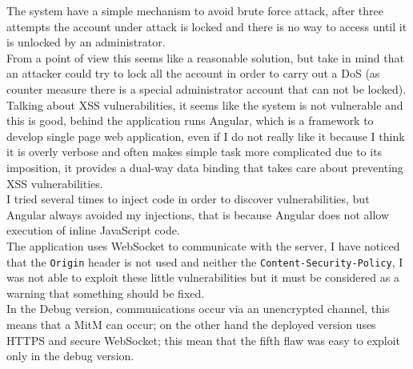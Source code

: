 The system have a simple mechanism to avoid brute force attack, after three attempts the account under attack is locked and there is no way to access
until it is unlocked by an administrator.\\
From a point of view this seems like a reasonable solution, but take in mind that an attacker could try to lock all the account in order to carry out
a DoS (as counter measure there is a special administrator account that can not be locked).\\
Talking about XSS vulnerabilities, it seems like the system is not vulnerable and this is good, behind the application runs Angular, which is a
framework to develop single page web application, even if I do not really like it because I think it is overly verbose and often makes simple task more complicated due to its imposition, it provides a dual-way data binding that takes care about preventing XSS vulnerabilities.\\
I tried several times to inject code in order to discover vulnerabilities, but Angular always avoided my injections, that is because Angular
does not allow execution of inline JavaScript code.\\

The application uses WebSocket to communicate with the server, I have noticed that the \texttt{Origin} header is not used and neither the \texttt{Content-Security-Policy}, I was not able to exploit these little vulnerabilities but it must be considered as a warning that something
should be fixed.\\
In the Debug version, communications occur via an unencrypted channel, this means that a MitM can occur; on the other hand
the deployed version uses HTTPS and secure WebSocket; this mean that the fifth flaw was easy to exploit only in the debug version.

